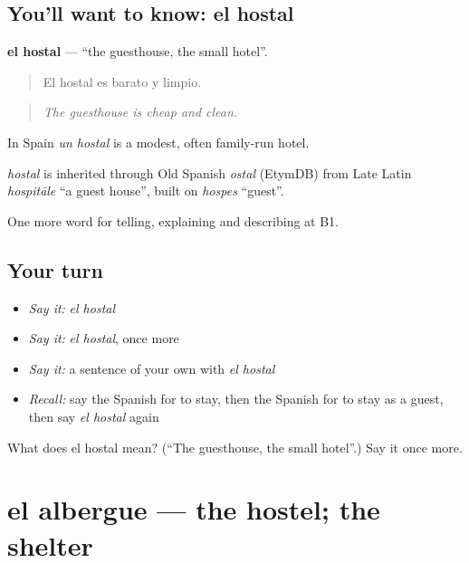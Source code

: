 \subsection*{You'll want to know: el hostal}
\textbf{el hostal} — \textquotedblleft{}the guesthouse, the small hotel\textquotedblright{}.

\begin{quote}
El hostal es barato y limpio.
\end{quote}

\begin{quote}
\emph{The guesthouse is cheap and clean.}
\end{quote}

In Spain \emph{un hostal} is a modest, often family-run hotel.

\begin{cousinweb}
\emph{hostal} is inherited through Old Spanish \emph{ostal} (EtymDB) from Late Latin \emph{hospitāle} \textquotedblleft{}a guest house\textquotedblright{}, built on \emph{hospes} \textquotedblleft{}guest\textquotedblright{}.
\end{cousinweb}

\begin{grammarlens}[title={What you've built}]
One more word for telling, explaining and describing at B1.
\end{grammarlens}

\subsection*{Your turn}
\begin{itemize}
\raggedright
  \item \emph{Say it:} \emph{el hostal}
  \item \emph{Say it:} \emph{el hostal}, once more
  \item \emph{Say it:} a sentence of your own with \emph{el hostal}
  \item \emph{Recall:} say the Spanish for to stay, then the Spanish for to stay as a guest, then say \emph{el hostal} again
\end{itemize}

\begin{tcolorbox}[breakable,colback=teal!4,colframe=teal!35!black,title={Before you move on}]
What does el hostal mean? (\textquotedblleft{}The guesthouse, the small hotel\textquotedblright{}.) Say it once more.
\end{tcolorbox}
\section[el albergue]{el albergue — the hostel; the shelter}

